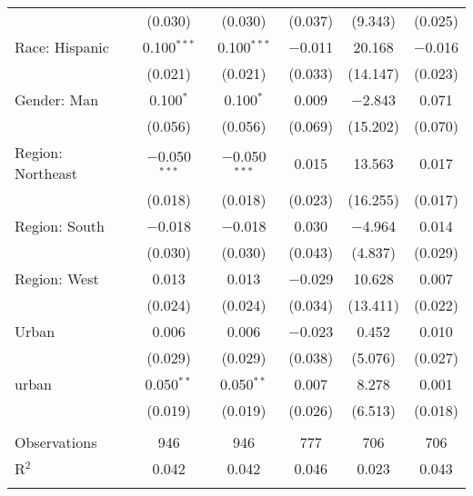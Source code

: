 \begin{tabular}{@{\extracolsep{5pt}}lccccc}
  & (0.030) & (0.030) & (0.037) & (9.343) & (0.025) \\ 
  Race: Hispanic & 0.100$^{***}$ & 0.100$^{***}$ & $-$0.011 & 20.168 & $-$0.016 \\ 
  & (0.021) & (0.021) & (0.033) & (14.147) & (0.023) \\ 
  Gender: Man & 0.100$^{*}$ & 0.100$^{*}$ & 0.009 & $-$2.843 & 0.071 \\ 
  & (0.056) & (0.056) & (0.069) & (15.202) & (0.070) \\ 
  Region: Northeast & $-$0.050$^{***}$ & $-$0.050$^{***}$ & 0.015 & 13.563 & 0.017 \\ 
  & (0.018) & (0.018) & (0.023) & (16.255) & (0.017) \\ 
  Region: South & $-$0.018 & $-$0.018 & 0.030 & $-$4.964 & 0.014 \\ 
  & (0.030) & (0.030) & (0.043) & (4.837) & (0.029) \\ 
  Region: West & 0.013 & 0.013 & $-$0.029 & 10.628 & 0.007 \\ 
  & (0.024) & (0.024) & (0.034) & (13.411) & (0.022) \\ 
  Urban & 0.006 & 0.006 & $-$0.023 & 0.452 & 0.010 \\ 
  & (0.029) & (0.029) & (0.038) & (5.076) & (0.027) \\ 
  urban & 0.050$^{**}$ & 0.050$^{**}$ & 0.007 & 8.278 & 0.001 \\ 
  & (0.019) & (0.019) & (0.026) & (6.513) & (0.018) \\ 
 \hline \\[-1.8ex] 

Observations & 946 & 946 & 777 & 706 & 706 \\ 
R$^{2}$ & 0.042 & 0.042 & 0.046 & 0.023 & 0.043 \\ 
\hline 
\hline \\[-1.8ex] 
\end{tabular} 